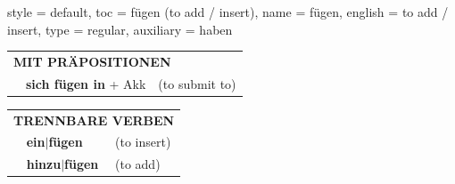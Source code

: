 \begin{verbentry}{
  style = {default},
  toc = {fügen (to add / insert)},
  name = {fügen},
  english = {to add / insert},
  type = {regular},
  auxiliary = {haben}
}
\vspace{10pt}

\begin{tabular}{lll}
\multicolumn{3}{l}{\textbf{MIT PRÄPOSITIONEN}}\\
& \textbf{sich fügen in} + Akk & (to submit to)\\
\end{tabular}
\hfill
\begin{tabular}{lll}
\multicolumn{3}{l}{\textbf{TRENNBARE VERBEN}}\\
& \textbf{ein$|$fügen} & (to insert)\\
& \textbf{hinzu$|$fügen} & (to add)\\
\end{tabular}

\vspace{-5pt}
\end{verbentry}

